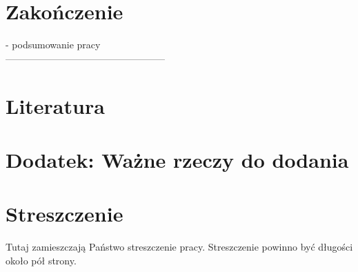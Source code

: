 \documentclass[polish, twoside, 12pt, a4paper]{article}
\theoremstyle{definition}
\theoremstyle{plain}
\theoremstyle{remark}
\begin{document}
\clearpage
\section{Zakończenie}


- podsumowanie pracy \\


--------------------------------------------------
\clearpage
\section{Literatura}



\appendix

\clearpage
\section{Dodatek: Ważne rzeczy do dodania}
 



\clearpage



\clearpage
{}
\listoftables

\clearpage
{}
\listoffigures



\clearpage
{}
\section*{Streszczenie}

Tutaj zamieszczają Państwo streszczenie pracy. Streszczenie powinno być długości około pół strony.
\end{document}
